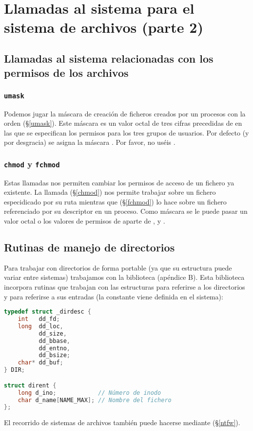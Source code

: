 \section{Llamadas al sistema para el sistema de archivos (parte 2)}

\subsection{Llamadas al sistema relacionadas con los permisos de los archivos}

\subsubsection{\texttt{umask}}

Podemos jugar la máscara de creación de ficheros creados por un procesos con la orden  (\S\ref{umask}).
Este máscara es un valor octal de tres cifras precedidas de  en las que se especifican los permisos  para los tres grupos de usuarios.
Por defecto (y por desgracia) se asigna la máscara .
Por favor, no uséis .

\subsubsection{\texttt{chmod} y \texttt{fchmod}}

Estas llamadas nos permiten cambiar los permisos de acceso de un fichero ya existente.
La llamada  (\S\ref{chmod}) nos permite trabajar sobre un fichero especidicado por su ruta mientras que  (\S\ref{fchmod}) lo hace sobre un fichero referenciado por su descriptor en un proceso.
Como máscara se le puede pasar un valor octal o los valores de permisos de  aparte de ,  y .

\subsection{Rutinas de manejo de directorios}

Para trabajar con directorios de forma portable (ya que su estructura puede variar entre sistemas) trabajamos con la biblioteca  (apéndice B).
Esta biblioteca incorpora rutinas que trabajan con las estructuras  para referirse a los directorios y  para referirse a sus entradas (la constante  viene definida en el sistema):

\begin{lstlisting}[language=C]
typedef struct _dirdesc {
	int   dd_fd;
	long  dd_loc,
	      dd_size,
	      dd_bbase,
	      dd_entno,
	      dd_bsize;
	char* dd_buf;
} DIR;

struct dirent {
	long d_ino;            // Número de inodo
	char d_name[NAME_MAX]; // Nombre del fichero
};
\end{lstlisting}

El recorrido de sistemas de archivos también puede hacerse mediante  (\S\ref{ntfw}).

